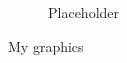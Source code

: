 \begin{landscape}
\begin{figure}
\begin{subfigure}[b]{0.3\textwidth}
    \caption{Placeholder}
    \label{fig:aPlaceholder}
  \end{subfigure}
  \caption{My graphics}
  \label{fig:myGraphics}
\end{figure}

\end{landscape}
